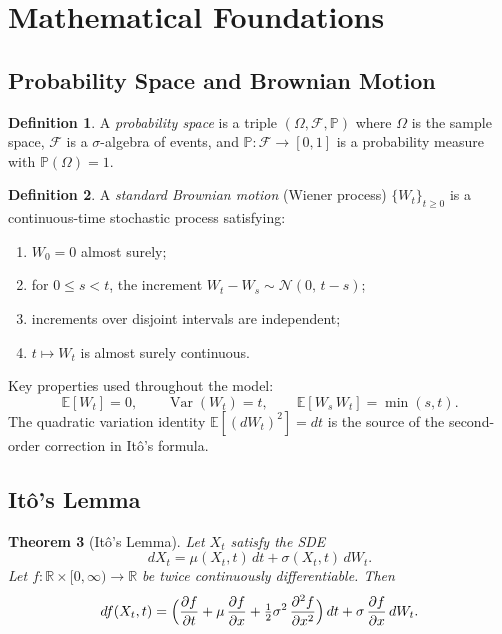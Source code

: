 \documentclass[11pt,a4paper]{article}
\theoremstyle{plain}
\newtheorem{theorem}{Theorem}[section]
\theoremstyle{definition}
\newtheorem{definition}[theorem]{Definition}
\newcommand{\E}{\mathbb{E}}
\newcommand{\Var}{\operatorname{Var}}
\newcommand{\sig}{\sigma}
\begin{document}
\section{Mathematical Foundations}

\subsection{Probability Space and Brownian Motion}

\begin{definition}
A \emph{probability space} is a triple $(\Omega,\mathcal{F},\mathbb{P})$ where
$\Omega$ is the sample space, $\mathcal{F}$ is a $\sigma$-algebra of events, and
$\mathbb{P}:\mathcal{F}\to[0,1]$ is a probability measure with $\mathbb{P}(\Omega)=1$.
\end{definition}

\begin{definition}
A \emph{standard Brownian motion} (Wiener process) $\{W_t\}_{t\geq 0}$ is a
continuous-time stochastic process satisfying:
\begin{enumerate}[leftmargin=1.8em]
  \item $W_0 = 0$ almost surely;
  \item for $0\leq s < t$, the increment $W_t - W_s \sim \mathcal{N}(0,\,t-s)$;
  \item increments over disjoint intervals are independent;
  \item $t\mapsto W_t$ is almost surely continuous.
\end{enumerate}
\end{definition}

Key properties used throughout the model:
\[
\E[W_t] = 0, \qquad \Var(W_t) = t, \qquad \E[W_s\,W_t] = \min(s,t).
\]
The quadratic variation identity $\E[(dW_t)^2] = dt$ is the source of
the second-order correction in It\^{o}'s formula.

\subsection{It\^{o}'s Lemma}

\begin{theorem}[It\^{o}'s Lemma]\label{thm:ito}
Let $X_t$ satisfy the SDE
\begin{equation}
  dX_t = \mu(X_t,t)\,dt + \sig(X_t,t)\,dW_t.
\end{equation}
Let $f:\mathbb{R}\times[0,\infty)\to\mathbb{R}$ be twice continuously
differentiable.  Then
\begin{equation}
  df(X_t,t)
  = \Bigl(
      \frac{\partial f}{\partial t}
    + \mu\,\frac{\partial f}{\partial x}
    + \tfrac{1}{2}\sig^2\,\frac{\partial^2 f}{\partial x^2}
    \Bigr)\,dt
  + \sig\,\frac{\partial f}{\partial x}\,dW_t.
\end{equation}
\end{theorem}
\end{document}
